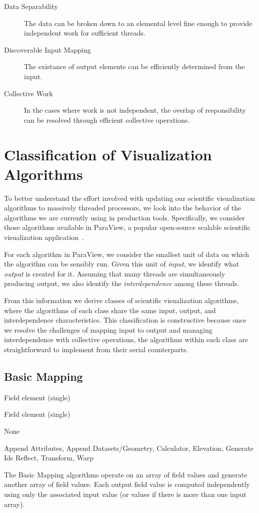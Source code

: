 \documentclass{sig-alternate}
\newcommand*{\lcite}[1]{~\cite{#1}}
\newcommand*{\keyterm}[1]{\emph{#1}}
\newcommand{\algclass}[1]{\textsf{#1}}
\newcommand{\algorithmclasssection}[1]{\subsection*{#1}}
\newcommand{\algorithmclass}[5]{
  \algorithmclasssection{#1} %
  \begin{description}[leftmargin=9em,style=nextline,noitemsep]
    \raggedright
  \item[Input] #2
  \item[Output] #3
  \item[Interdependence] #4
  \item[Algorithms] #5
  \end{description}
}
\begin{document}
\begin{description}
\item[Data Separability] The data can be broken down to an elemental level
  fine enough to provide independent work for sufficient threads.
\item[Discoverable Input Mapping] The existance of output elements can be
  efficiently determined from the input.
\item[Collective Work] In the cases where work is not independent, the
  overlap of responsibility can be resolved through efficient collective
  operations.
\end{description}


\section{Classification of Visualization Algorithms}
\label{sec:Classification}

\noindent
To better understand the effort involved with updating our scientific
visualization algorithms to massively threaded processors, we look into the
behavior of the algorithms we are currently using in production
tools. Specifically, we consider those algorithms available in ParaView, a
popular open-source scalable scientific visualization
application\lcite{ParaView}.

For each algorithm in ParaView, we consider the smallest unit of data on
which the algorithm can be sensibly run. Given this unit of
\keyterm{input}, we identify what \keyterm{output} is created for
it. Assuming that many threads are simultaneously producing output, we also
identify the \keyterm{interdependence} among these threads.

From this information we derive classes of scientific visualization
algorithms, where the algorithms of each class share the same input,
output, and interdependence characteristics. This classification is
constructive because once we resolve the challenges of mapping input to
output and managing interdependence with collective operations, the
algorithms within each class are straightforward to implement from their
serial counterparts.

\algorithmclass{Basic Mapping}
               {Field element (single)} %
               {Field element (single)} %
               {None} %
               {Append Attributes, Append Datasets/Geometry, Calculator,
                 Elevation, Generate Ids Reflect, Transform, Warp}

\noindent
The \algclass{Basic Mapping} algorithms operate on an array of field values
and generate another array of field values. Each output field value is
computed independently using only the associated input value (or values if
there is more than one input array).
\end{document}
